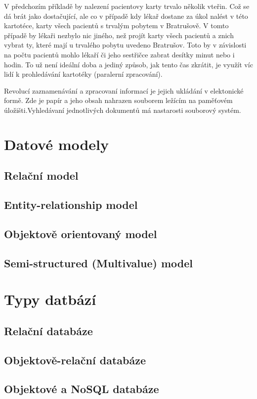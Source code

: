 V předchozím příkladě by nalezení pacientovy karty trvalo několik vteřin. Což se dá brát jako dostačující, ale co v případě kdy lékař dostane za úkol nalést v této kartotéce, karty všech pacientů s trvalým pobytem v Bratrušově. V tomto případě by lékaři nezbylo nic jiného, než projít karty všech pacientů a znich vybrat ty, které mají u trvalého pobytu uvedeno Bratrušov. Toto by v závislosti na počtu pacientů mohlo lékaří či jeho sestřičce zabrat desítky minut nebo i hodin. To už není ideální doba a jediný způsob, jak tento čas zkrátit, je využít víc lidí k prohledávání kartotéky (paralerní zpracování).

Revolucí zaznamenávání a zpracovaní informací je jejich ukládání v elektonické formě. Zde je papír a jeho obsah nahrazen souborem ležícím na paměťovém úložišti.Vyhledávaní jednotlivých dokumentů má nastarosti souborový systém.



\cite[s.~1--52]{korth:dbsc}
\section{Datové modely}
\subsection{Relační model}
\subsection{Entity-relationship model}
\subsection{Objektově orientovaný model}
\subsection{Semi-structured (Multivalue) model}
\section{Typy datbází}
\subsection{Relační databáze}
\subsection{Objektově-relační databáze}
\subsection{Objektové a NoSQL databáze}
\cite[s.~945--975]{korth:dbsc}
